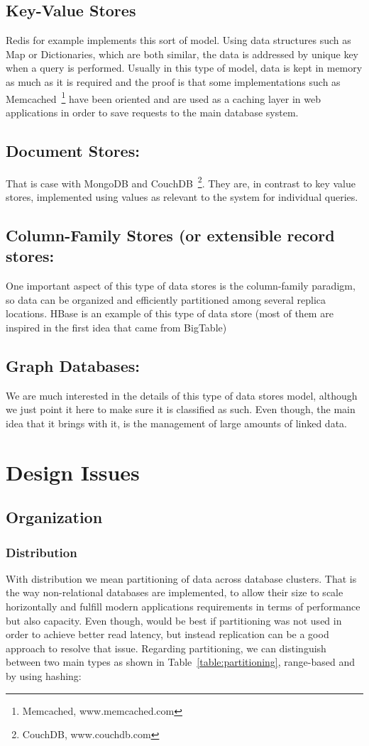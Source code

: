 	\subsection{Key-Value Stores}
	Redis for example implements this sort of model. Using data structures such as Map or Dictionaries, which are both similar, the data is addressed by unique key when a query is performed. Usually in this type of model, data is kept in memory as much as it is required and the proof is that some implementations such as Memcached~\footnote{Memcached, www.memcached.com} have been oriented and are used as a caching layer in web applications in order to save requests to the main database system.
	\subsection{Document Stores:}
	That is case with MongoDB and CouchDB~\footnote{CouchDB, www.couchdb.com}. They are, in contrast to key value stores, implemented using values as relevant to the system for individual queries.
	\subsection{Column-Family Stores (or extensible record stores:}
	One important aspect of this type of data stores is the column-family paradigm, so data can be organized and efficiently partitioned among several replica locations. HBase is an example of this type of data store (most of them are inspired in the first idea that came from BigTable)
	\subsection{Graph Databases:}
	We are much interested in the details of this type of data stores model, although we just point it here to make sure it is classified as such. Even though, the main idea that it brings with it, is the management of large amounts of linked data.

\section{Design Issues}
	
\subsection{Organization}
	\subsubsection{Distribution}
	With distribution we mean partitioning of data across database clusters. That is the way non-relational databases are implemented, to allow their size to scale horizontally and fulfill modern applications requirements in terms of performance but also capacity. Even though, would be best if partitioning was not used in order to achieve better read latency, but instead replication can be a good approach to resolve that issue. Regarding partitioning, we can distinguish between two main types as shown in Table~\ref{table:partitioning}, range-based and by using hashing:
	
